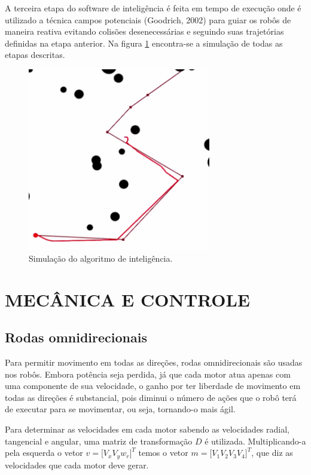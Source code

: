 \documentclass[letterpaper, 10 pt, conference]{ieeeconf}  %
\begin{document}
A terceira etapa do software de inteligência é feita em tempo de execução onde é utilizado a técnica campos potenciais (Goodrich, 2002)\cite{goodrich} para guiar os robôs de maneira reativa evitando colisões desenecessárias e seguindo suas trajetórias definidas na etapa anterior. Na figura \ref{img:myalgorithm} encontra-se a simulação de todas as etapas descritas.

\begin{figure}[thpb]
	\centering
	\includegraphics[width=8cm]{img/ex1}
	\caption{Simulação do algoritmo de inteligência.}
	\label{img:myalgorithm}
\end{figure}

\section{MECÂNICA E CONTROLE}
\subsection{Rodas omnidirecionais}
Para permitir movimento em todas as direções, rodas omnidirecionais são usadas nos robôs. Embora potência seja perdida, já que cada motor atua apenas com uma componente de sua velocidade, o ganho por ter liberdade de movimento em todas as direções é substancial, pois diminui o número de ações que o robô terá de executar para se movimentar, ou seja, tornando-o mais ágil. 

Para determinar as velocidades em cada motor sabendo as velocidades radial, tangencial e angular, uma matriz de transformação $D$ é utilizada. Multiplicando-a pela esquerda o vetor $v = [V_x$\hspace{0.25cm}$V_y$\hspace{0.25cm}$w_r]^T$ temos o vetor $m = [V_1$\hspace{0.25cm}$V_2$\hspace{0.25cm}$V_3$\hspace{0.25cm}$V_4]^T$, que diz as velocidades que cada motor deve gerar.
\end{document}
